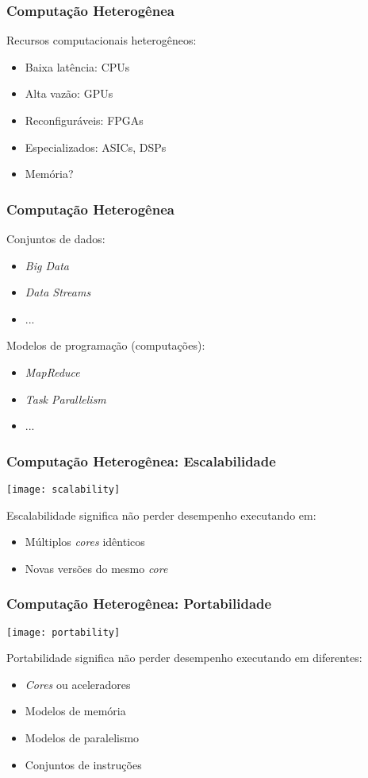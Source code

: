 \documentclass[10pt, compress]{beamer}
\begin{document}
\begin{frame}
    \frametitle{Computação Heterogênea}
    Recursos computacionais \alert{heterogêneos}:
    \begin{itemize}
        \item Baixa latência: CPUs
        \item Alta vazão: GPUs
        \item Reconfiguráveis: FPGAs
        \item Especializados: ASICs, DSPs
        \item Memória?
    \end{itemize}
\end{frame}

\begin{frame}
    \frametitle{Computação Heterogênea}
    Conjuntos de \alert{dados}:
    \begin{itemize}
        \item \textit{Big Data}
        \item \textit{Data Streams}
        \item ...
    \end{itemize}
    Modelos de programação (\alert{computações}):
    \begin{itemize}
        \item \textit{MapReduce}
        \item \textit{Task Parallelism}
        \item ...
    \end{itemize}
\end{frame}

\begin{frame}
    \frametitle{Computação Heterogênea: Escalabilidade}
    \begin{center}
        \texttt{[image: scalability]}
    \end{center}

    \alert{Escalabilidade} significa não perder desempenho
        executando em:
    \begin{itemize}
        \item Múltiplos \textit{cores} idênticos
        \item Novas versões do mesmo \textit{core}
    \end{itemize}
\end{frame}

\begin{frame}
    \frametitle{Computação Heterogênea: Portabilidade}
    \begin{center}
        \texttt{[image: portability]}
    \end{center}

    \alert{Portabilidade} significa não perder desempenho
        executando em diferentes:
    \begin{itemize}
        \item \textit{Cores} ou \alert{aceleradores}
        \item Modelos de memória
        \item Modelos de paralelismo
        \item Conjuntos de instruções
    \end{itemize}
\end{frame}
\end{document}
